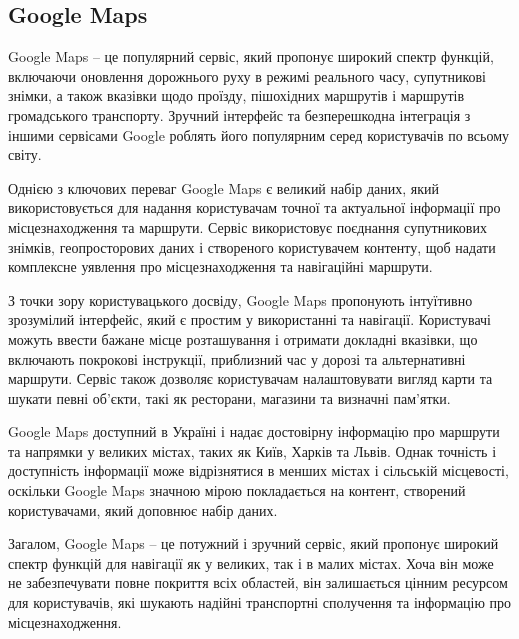 \subsection{Google Maps}
\label{subsec:google-maps-subsection}

Google Maps -- це популярний сервіс, який пропонує широкий спектр функцій, включаючи оновлення дорожнього руху в режимі реального часу, супутникові знімки, а також вказівки щодо проїзду, пішохідних маршрутів і маршрутів громадського транспорту. Зручний інтерфейс та безперешкодна інтеграція з іншими сервісами Google роблять його популярним серед користувачів по всьому світу.

Однією з ключових переваг Google Maps є великий набір даних, який використовується для надання користувачам точної та актуальної інформації про місцезнаходження та маршрути. Сервіс використовує поєднання супутникових знімків, геопросторових даних і створеного користувачем контенту, щоб надати комплексне уявлення про місцезнаходження та навігаційні маршрути.

З точки зору користувацького досвіду, Google Maps пропонують інтуїтивно зрозумілий інтерфейс, який є простим у використанні та навігації. Користувачі можуть ввести бажане місце розташування і отримати докладні вказівки, що включають покрокові інструкції, приблизний час у дорозі та альтернативні маршрути. Сервіс також дозволяє користувачам налаштовувати вигляд карти та шукати певні об'єкти, такі як ресторани, магазини та визначні пам'ятки.

Google Maps доступний в Україні і надає достовірну інформацію про маршрути та напрямки у великих містах, таких як Київ, Харків та Львів. Однак точність і доступність інформації може відрізнятися в менших містах і сільській місцевості, оскільки Google Maps значною мірою покладається на контент, створений користувачами, який доповнює набір даних.

Загалом, Google Maps -- це потужний і зручний сервіс, який пропонує широкий спектр функцій для навігації як у великих, так і в малих містах. Хоча він може не забезпечувати повне покриття всіх областей, він залишається цінним ресурсом для користувачів, які шукають надійні транспортні сполучення та інформацію про місцезнаходження.
